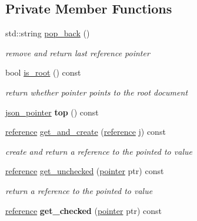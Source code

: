 \subsection*{Private Member Functions}
\begin{DoxyCompactItemize}
\item 
std\+::string \hyperlink{classnlohmann_1_1basic__json_1_1json__pointer_a1f2a9e13d44824b29f0019ecdebf9775}{pop\+\_\+back} ()
\begin{DoxyCompactList}\small\item\em remove and return last reference pointer \end{DoxyCompactList}\item 
bool \hyperlink{classnlohmann_1_1basic__json_1_1json__pointer_aeb09cbb35ee44e7970ff7ec7657f1c5d}{is\+\_\+root} () const 
\begin{DoxyCompactList}\small\item\em return whether pointer points to the root document \end{DoxyCompactList}\item 
\hypertarget{classnlohmann_1_1basic__json_1_1json__pointer_aefec301ce04240455cb8aadf653275c6}{}\hyperlink{classnlohmann_1_1basic__json_1_1json__pointer}{json\+\_\+pointer} {\bfseries top} () const \label{classnlohmann_1_1basic__json_1_1json__pointer_aefec301ce04240455cb8aadf653275c6}

\item 
\hyperlink{classnlohmann_1_1basic__json_a3ec8e17be8732fe436e9d6733f52b7a3}{reference} \hyperlink{classnlohmann_1_1basic__json_1_1json__pointer_a130e3040d2947d8743bf481c6d7cd9e7}{get\+\_\+and\+\_\+create} (\hyperlink{classnlohmann_1_1basic__json_a3ec8e17be8732fe436e9d6733f52b7a3}{reference} j) const 
\begin{DoxyCompactList}\small\item\em create and return a reference to the pointed to value \end{DoxyCompactList}\item 
\hyperlink{classnlohmann_1_1basic__json_a3ec8e17be8732fe436e9d6733f52b7a3}{reference} \hyperlink{classnlohmann_1_1basic__json_1_1json__pointer_aa152cc2c3f77a7cd0bc2c3e54430dfe4}{get\+\_\+unchecked} (\hyperlink{classnlohmann_1_1basic__json_a9d1b58099dc64695fcf2847ab0b2a7c7}{pointer} ptr) const 
\begin{DoxyCompactList}\small\item\em return a reference to the pointed to value \end{DoxyCompactList}\item 
\hypertarget{classnlohmann_1_1basic__json_1_1json__pointer_ac6ef3554aba4abd282ee9e4aca77f43e}{}\hyperlink{classnlohmann_1_1basic__json_a3ec8e17be8732fe436e9d6733f52b7a3}{reference} {\bfseries get\+\_\+checked} (\hyperlink{classnlohmann_1_1basic__json_a9d1b58099dc64695fcf2847ab0b2a7c7}{pointer} ptr) const \label{classnlohmann_1_1basic__json_1_1json__pointer_ac6ef3554aba4abd282ee9e4aca77f43e}


\end{DoxyCompactItemize}
